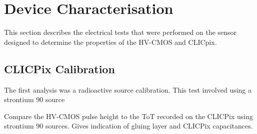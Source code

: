 \section{Device Characterisation}

This section describes the electrical tests that were performed on the sensor designed to determine the properties of the HV-CMOS and CLICpix.  

\subsection{CLICPix Calibration}
The first analysis was a radioactive source calibration.  This test involved using a strontium 90 source 

Compare the HV-CMOS pulse height to the ToT recorded on the CLICPix using strontium 90 sources.  Gives indication of gluing layer and CLICPix capacitances.  

